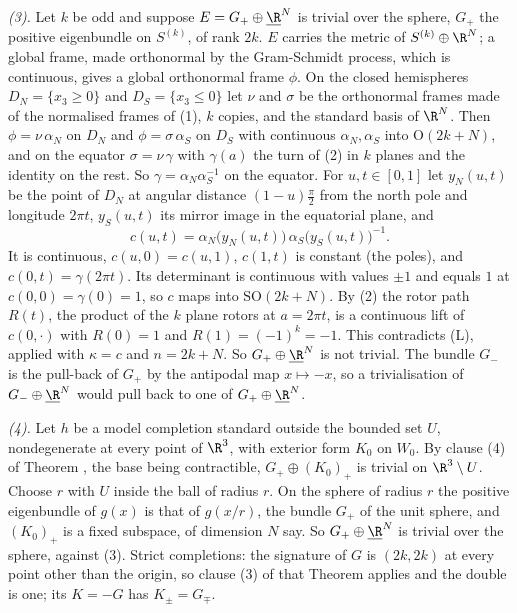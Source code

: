 \emph{(3).} Let $k$ be odd and suppose $E = G_{+} \oplus \underline{\R}^{N}$ is trivial over the sphere, $G_{+}$ the positive eigenbundle on $S^{(k)}$, of rank $2k$. $E$ carries the metric of $S^{(k)} \oplus \R^{N}$; a global frame, made orthonormal by the Gram-Schmidt process, which is continuous, gives a global orthonormal frame $\phi$. On the closed hemispheres $D_{N} = \{x_{3} \geq 0\}$ and $D_{S} = \{x_{3} \leq 0\}$ let $\nu$ and $\sigma$ be the orthonormal frames made of the normalised frames of (1), $k$ copies, and the standard basis of $\R^{N}$. Then $\phi = \nu\,\alpha_{N}$ on $D_{N}$ and $\phi = \sigma\,\alpha_{S}$ on $D_{S}$ with continuous $\alpha_{N}, \alpha_{S}$ into $\mathrm{O}(2k + N)$, and on the equator $\sigma = \nu\,\gamma$ with $\gamma(a)$ the turn of (2) in $k$ planes and the identity on the rest. So $\gamma = \alpha_{N}\alpha_{S}^{-1}$ on the equator. For $u, t \in [0,1]$ let $y_{N}(u,t)$ be the point of $D_{N}$ at angular distance $(1-u)\tfrac\pi2$ from the north pole and longitude $2\pi t$, $y_{S}(u,t)$ its mirror image in the equatorial plane, and
\[
c(u,t) = \alpha_{N}\bigl(y_{N}(u,t)\bigr)\,\alpha_{S}\bigl(y_{S}(u,t)\bigr)^{-1} .
\]
It is continuous, $c(u,0) = c(u,1)$, $c(1,t)$ is constant (the poles), and $c(0,t) = \gamma(2\pi t)$. Its determinant is continuous with values $\pm 1$ and equals $1$ at $c(0,0) = \gamma(0) = 1$, so $c$ maps into $\mathrm{SO}(2k + N)$. By (2) the rotor path $R(t)$, the product of the $k$ plane rotors at $a = 2\pi t$, is a continuous lift of $c(0,\cdot)$ with $R(0) = 1$ and $R(1) = (-1)^{k} = -1$. This contradicts (L), applied with $\kappa = c$ and $n = 2k + N$. So $G_{+} \oplus \underline{\R}^{N}$ is not trivial. The bundle $G_{-}$ is the pull-back of $G_{+}$ by the antipodal map $x \mapsto -x$, so a trivialisation of $G_{-} \oplus \underline{\R}^{N}$ would pull back to one of $G_{+} \oplus \underline{\R}^{N}$.

\emph{(4).} Let $h$ be a model completion standard outside the bounded set $U$, nondegenerate at every point of $\R^{3}$, with exterior form $K_{0}$ on $W_{0}$. By clause (4) of Theorem , the base being contractible, $G_{+} \oplus (K_{0})_{+}$ is trivial on $\R^{3} \setminus U$. Choose $r$ with $U$ inside the ball of radius $r$. On the sphere of radius $r$ the positive eigenbundle of $g(x)$ is that of $g(x/r)$, the bundle $G_{+}$ of the unit sphere, and $(K_{0})_{+}$ is a fixed subspace, of dimension $N$ say. So $G_{+} \oplus \underline{\R}^{N}$ is trivial over the sphere, against (3). Strict completions: the signature of $G$ is $(2k,2k)$ at every point other than the origin, so clause (3) of that Theorem applies and the double is one; its $K = -G$ has $K_{\pm} = G_{\mp}$.

